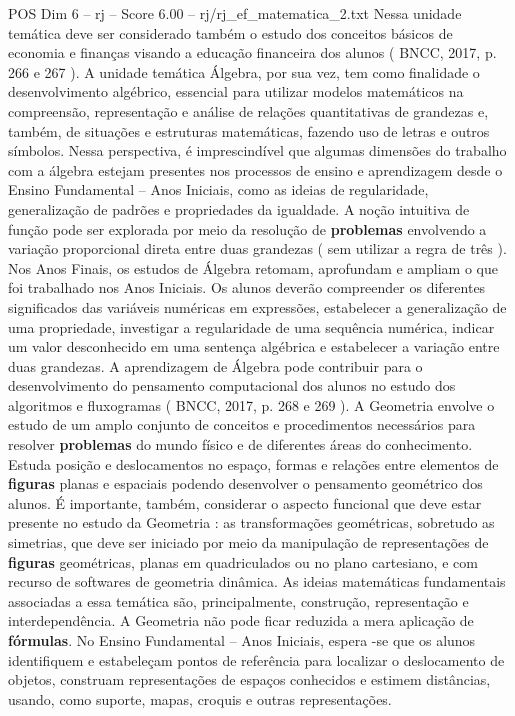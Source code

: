 \begin{textsample}{POS Dim 6 – rj – Score 6.00 – rj/rj\_ef\_matematica\_2.txt}
Nessa unidade temática deve ser considerado também o estudo dos conceitos básicos de economia e finanças visando a educação financeira dos alunos ( BNCC, 2017, p. 266 e 267 ).
A unidade temática Álgebra, por sua vez, tem como finalidade o desenvolvimento algébrico, essencial para utilizar modelos matemáticos na compreensão, representação e análise de relações quantitativas de grandezas e, também, de situações e estruturas matemáticas, fazendo uso de letras e outros símbolos.
Nessa perspectiva, é imprescindível que algumas dimensões do trabalho com a álgebra estejam presentes nos processos de ensino e aprendizagem desde o Ensino Fundamental – Anos Iniciais, como as ideias de regularidade, generalização de padrões e propriedades da igualdade.
A noção intuitiva de função pode ser explorada por meio da resolução de \textbf{problemas} envolvendo a variação proporcional direta entre duas grandezas ( sem utilizar a regra de três ).
Nos Anos Finais, os estudos de Álgebra retomam, aprofundam e ampliam o que foi trabalhado nos Anos Iniciais.
Os alunos deverão compreender os diferentes significados das variáveis numéricas em expressões, estabelecer a generalização de uma propriedade, investigar a regularidade de uma sequência numérica, indicar um valor desconhecido em uma sentença algébrica e estabelecer a variação entre duas grandezas.
A aprendizagem de Álgebra pode contribuir para o desenvolvimento do pensamento computacional dos alunos no estudo dos algoritmos e fluxogramas ( BNCC, 2017, p. 268 e 269 ).
A Geometria envolve o estudo de um amplo conjunto de conceitos e procedimentos necessários para resolver \textbf{problemas} do mundo físico e de diferentes áreas do conhecimento.
Estuda posição e deslocamentos no espaço, formas e relações entre elementos de \textbf{figuras} planas e espaciais podendo desenvolver o pensamento geométrico dos alunos.
É importante, também, considerar o aspecto funcional que deve estar presente no estudo da Geometria : as transformações geométricas, sobretudo as simetrias, que deve ser iniciado por meio da manipulação de representações de \textbf{figuras} geométricas, planas em quadriculados ou no plano cartesiano, e com recurso de softwares de geometria dinâmica.
As ideias matemáticas fundamentais associadas a essa temática são, principalmente, construção, representação e interdependência.
A Geometria não pode ficar reduzida a mera aplicação de \textbf{fórmulas}.
No Ensino Fundamental – Anos Iniciais, espera -se que os alunos identifiquem e estabeleçam pontos de referência para localizar o deslocamento de objetos, construam representações de espaços conhecidos e estimem distâncias, usando, como suporte, mapas, croquis e outras representações.

\end{textsample}
